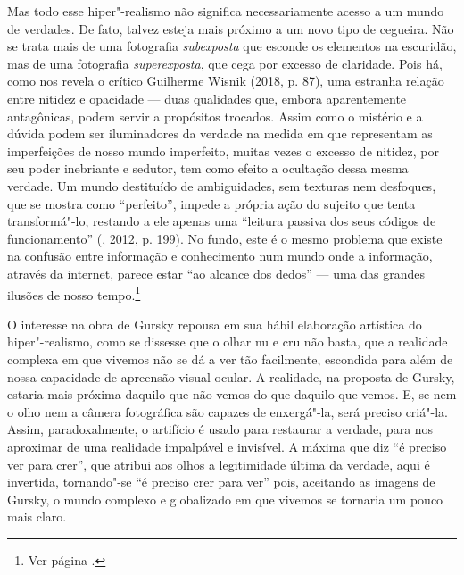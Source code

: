 Mas todo esse hiper"-realismo não significa necessariamente acesso a um
mundo de verdades. De fato, talvez esteja mais próximo a um novo tipo de
cegueira. Não se trata mais de uma fotografia \emph{subexposta} que
esconde os elementos na escuridão, mas de uma fotografia
\emph{superexposta}, que cega por excesso de claridade. Pois há, como
nos revela o crítico Guilherme Wisnik (2018, p. 87), uma estranha
relação entre nitidez e opacidade --- duas qualidades que, embora
aparentemente antagônicas, podem servir a propósitos trocados. Assim
como o mistério e a dúvida podem ser iluminadores da verdade na medida
em que representam as imperfeições de nosso mundo imperfeito, muitas
vezes o excesso de nitidez, por seu poder inebriante e sedutor, tem como
efeito a ocultação dessa mesma verdade. Um mundo destituído de
ambiguidades, sem texturas nem desfoques, que se mostra como
``perfeito'', impede a própria ação do sujeito que tenta transformá"-lo,
restando a ele apenas uma ``leitura passiva dos seus códigos de
funcionamento'' (, 2012, p. 199). No fundo, este é o mesmo
problema que existe na confusão entre informação e conhecimento num
mundo onde a informação, através da internet, parece estar ``ao alcance
dos dedos'' --- uma das grandes ilusões de nosso tempo.\footnote{Ver
  página \pageref{ubiquidade}.}

O interesse na obra de Gursky repousa em sua hábil elaboração artística
do hiper"-realismo, como se dissesse que o olhar nu e cru não basta, que a
realidade complexa em que vivemos não se dá a ver tão facilmente,
escondida para além de nossa capacidade de apreensão visual ocular. A
realidade, na proposta de Gursky, estaria mais próxima daquilo que não
vemos do que daquilo que vemos. E, se nem o olho nem a câmera
fotográfica são capazes de enxergá"-la, será preciso criá"-la. Assim,
paradoxalmente, o artifício é usado para restaurar a verdade, para nos
aproximar de uma realidade impalpável e invisível. A máxima que diz ``é
preciso ver para crer'', que atribui aos olhos a legitimidade última da
verdade, aqui é invertida, tornando"-se ``é preciso crer para ver'' pois,
aceitando as imagens de Gursky, o mundo complexo e globalizado em que vivemos se tornaria um pouco mais claro.

